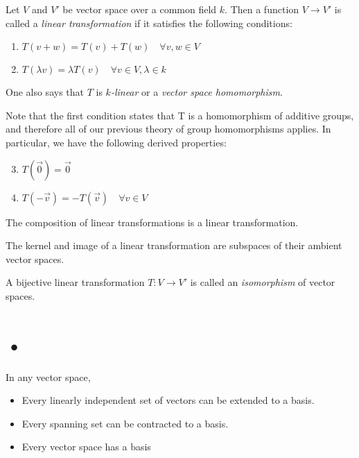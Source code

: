 \documentclass[a5paper]{article}
\begin{document}
\begin{definition*}
Let $V$ and $V'$ be vector space over a common field $k$. Then a function $V\to V'$ is called a \emph{linear transformation} if it satisfies the following conditions:

\begin{enumerate}[label=(\roman*)]
\item $T(v+w)=T(v)+T(w) \quad \forall v,w \in V$
\item $T(\lambda v)=\lambda T(v) \quad \forall v \in V, \lambda \in k$
\end{enumerate}

One also says that $T$ is \emph{$k$-linear} or a \emph{vector space homomorphism}. 
\end{definition*}

Note that the first condition states that T is a homomorphism of additive groups, and therefore all of our previous theory of group homomorphisms applies. In particular, we have the following derived properties: 

\begin{enumerate}[label=(\roman*)]
\setcounter{enumi}{2}
\item $T(\vec{0})=\vec{0}$
\item $T(-\vec{v})=-T(\vec{v})\quad \forall v \in V$
\end{enumerate}

\begin{proposition}
The composition of linear transformations is a linear transformation.
\end{proposition}

\begin{proposition}
The kernel and image of a linear transformation are subspaces of their ambient vector spaces. 
\end{proposition}

\begin{definition*}
A bijective linear transformation $T: V \to V'$ is called an \emph{isomorphism} of vector spaces. 
\end{definition*}

\section{•}


\begin{theorem}
In any vector space, 
\begin{itemize}
	\item Every linearly independent set of vectors can be extended to a basis. 
	\item Every spanning set can be contracted to a basis. 
	\item Every vector space has a basis
\end{itemize}
\end{theorem}
\end{document}
